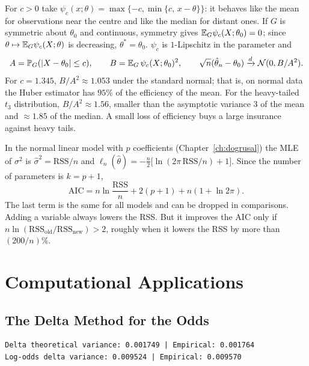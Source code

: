 \documentclass[main.tex]{subfiles}
\begin{document}
\begin{example}\label{ex:huber}
For $c>0$ take $\psi_c(x;\theta)=\max\{-c,\min\{c,\,x-\theta\}\}$: it behaves like the mean for observations near the centre and like the median for distant ones. If $G$ is symmetric about $\theta_0$ and continuous, symmetry gives $\mathbb{E}_G\psi_c(X;\theta_0)=0$; since $\theta\mapsto\mathbb{E}_G\psi_c(X;\theta)$ is decreasing, $\theta^*=\theta_0$. $\psi_c$ is $1$-Lipschitz in the parameter and
\[
A=\mathbb{P}_G(|X-\theta_0|\le c),\qquad B=\mathbb{E}_G\,\psi_c(X;\theta_0)^2,\qquad\sqrt n(\hat\theta_n-\theta_0)\xrightarrow{d}\mathcal{N}(0,B/A^2).
\]
For $c=1.345$, $B/A^2\approx1.053$ under the standard normal; that is, on normal data the Huber estimator has $95\%$ of the efficiency of the mean. For the heavy-tailed $t_3$ distribution, $B/A^2\approx1.56$, smaller than the asymptotic variance $3$ of the mean and $\approx1.85$ of the median. A small loss of efficiency buys a large insurance against heavy tails.
\end{example}

\begin{example}\label{ex:aic-normal}
In the normal linear model with $p$ coefficients (Chapter~\ref{ch:dogrusal}) the MLE of $\sigma^2$ is $\hat\sigma^2=\mathrm{RSS}/n$ and $\ell_n(\hat\theta)=-\frac n2\big[\ln(2\pi\,\mathrm{RSS}/n)+1\big]$. Since the number of parameters is $k=p+1$,
\[
\mathrm{AIC}=n\ln\frac{\mathrm{RSS}}{n}+2(p+1)+n(1+\ln2\pi).
\]
The last term is the same for all models and can be dropped in comparisons. Adding a variable always lowers the RSS. But it improves the AIC only if $n\ln(\mathrm{RSS}_{\text{old}}/\mathrm{RSS}_{\text{new}})>2$, roughly when it lowers the RSS by more than $(200/n)\%$.
\end{example}

\section{Computational Applications}

\subsection{The Delta Method for the Odds}

\begin{lstlisting}[style=output]
Delta theoretical variance: 0.001749 | Empirical: 0.001764
Log-odds delta variance: 0.009524 | Empirical: 0.009570
\end{lstlisting}
\end{document}
